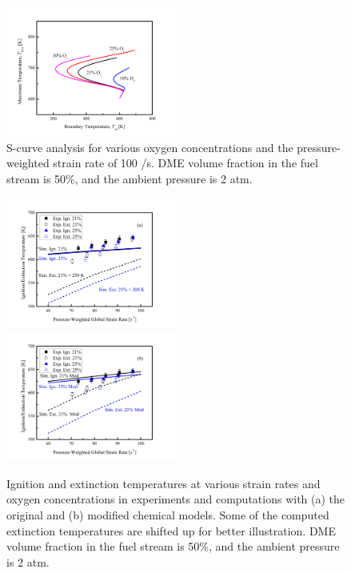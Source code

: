 \documentclass[review,3p,times]{elsarticle}
\begin{document}
\begin{figure}[t]
  \centering
  \scriptsize
  \includegraphics[trim=6.5mm 7.5mm 7mm 8mm, clip=true, width=0.5\textwidth]{eff_O2.png}
  \normalsize
  \caption{S-curve analysis for various oxygen concentrations and the pressure-weighted strain rate of 100 /s.  DME volume fraction in the fuel stream is 50\%, and the ambient pressure is 2 atm.}
  \label{fig:eff_O2}
\end{figure}

\begin{figure}[t]
  \centering
  \scriptsize
  \includegraphics[trim=6.5mm 7.5mm 7mm 8mm, clip=true, width=0.5\textwidth]{cmp_O2.png}
  \includegraphics[trim=6.5mm 7.5mm 7mm 8mm, clip=true, width=0.5\textwidth]{cmp_O2_mod.png}
  \normalsize
  \caption{Ignition and extinction temperatures at various strain rates and oxygen concentrations in experiments and computations with (a) the original and (b) modified chemical models.  Some of the computed extinction temperatures are shifted up for better illustration.  DME volume fraction in the fuel stream is 50\%, and the ambient pressure is 2 atm.}
  \label{fig:cmp_O2}
\end{figure}
\end{document}
